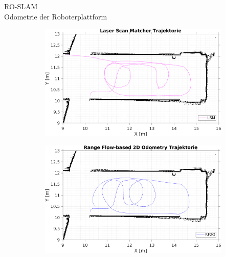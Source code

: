 \documentclass{beamer}
\begin{document}
\begin{frame}{RO-SLAM\\\normalsize{Odometrie der Roboterplattform}}
\begin{figure}
		\bigskip
		\begin{subfigure}{0.47\linewidth}
			\centering
			\includegraphics[width=\linewidth]{Record_2018-02-08-12-33-53_trajectory3}
		\end{subfigure}
		\hfill
		\begin{subfigure}{0.47\linewidth}
			\centering
			\includegraphics[width=\linewidth]{Record_2018-02-08-12-33-53_trajectory4}
		\end{subfigure}
	\end{figure}

\end{frame}
\end{document}
